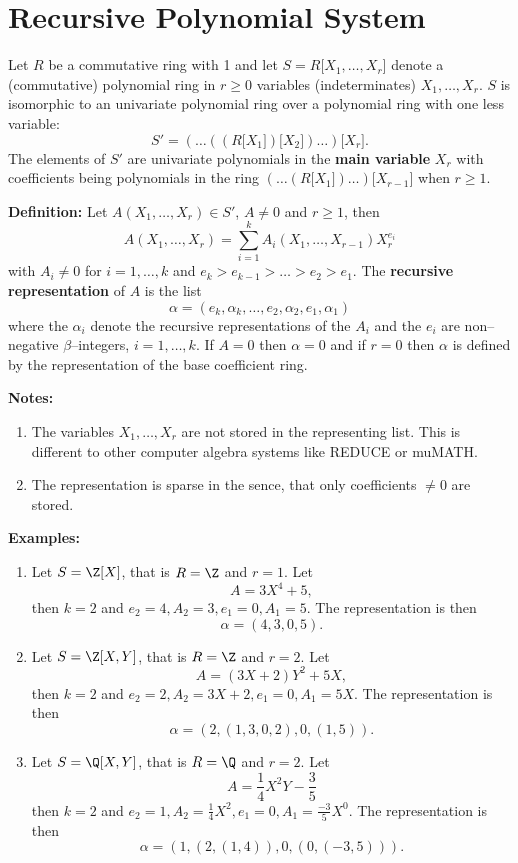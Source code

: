 \section{Recursive Polynomial System} %

Let $R$ be a commutative ring with 1 and let 
$S = R \lbrack X_1, \ldots, X_r \rbrack$ denote a  
(commutative) polynomial ring in $r \geq 0$ variables  
(indeterminates) $X_1, \ldots, X_r$.
$S$ is isomorphic to an univariate polynomial ring 
over a polynomial ring with one less variable:
$$ S' =
 ( \ldots ( (R \lbrack X_1 \rbrack) \lbrack X_2 \rbrack ) 
   \ldots ) \lbrack X_r \rbrack.
$$
The elements of $S'$ are univariate polynomials in the 
{\bf main variable} $X_r$ with coefficients being 
polynomials in the ring  
$( \ldots (R\lbrack X_1 \rbrack ) \ldots) \lbrack X_{r-1} \rbrack$
when $r \geq 1$. 

{\bf Definition:}
Let $A(X_1, \ldots, X_r) \in S'$, $A \neq 0$ and $r \geq 1$,
then 
$$ A(X_1, \ldots, X_r) = 
   \sum_{i=1}^{k} A_i(X_1, \ldots, X_{r-1}) X_r^{e_i}
$$ 
with $A_i \neq 0$ for $i=1,\ldots,k$ and 
$e_k > e_{k-1} > \ldots > e_2 > e_1$. 
The {\bf recursive representation} of $A$ is the list
$$
  \alpha = ( e_k, \alpha_k, \ldots, e_2, \alpha_2, e_1, \alpha_1 ) 
$$   
where the $\alpha_i$ denote the  
recursive representations of the $A_i$ and the $e_i$ are 
non--negative $\beta$--integers, $i=1,\ldots,k$.  
If $A = 0$ then $\alpha = 0$ and 
if $r = 0$ then $\alpha$ is defined by the 
representation of the base coefficient ring.  

{\bf Notes:}
\begin{enumerate}
\item The variables $X_1, \ldots, X_r$ are not stored 
      in the representing list. This is different to 
      other computer algebra systems like REDUCE or muMATH.
\item The representation is sparse in the sence, that 
      only coefficients $\neq 0$ are stored.
\end{enumerate}

{\bf Examples:}
\begin{enumerate}
\item Let $S = \Z \lbrack X \rbrack$, that is $R = \Z$ and $r = 1$.
      Let $$A = 3 X^4 + 5,$$
      then $k = 2$ and $e_2 = 4, A_2 = 3, e_1 = 0, A_1 = 5$. 
      The representation is then 
      $$ \alpha = ( 4, 3, 0, 5 ). $$
\item Let $S = \Z \lbrack X, Y \rbrack$, 
      that is $R = \Z$ and $r = 2$.
      Let $$A = ( 3 X + 2 ) Y^2 + 5 X,$$
      then $k = 2$ and $e_2 = 2, A_2 = 3 X + 2, e_1 = 0, A_1 = 5 X$. 
      The representation is then 
      $$ \alpha = ( 2, ( 1, 3, 0, 2 ), 0, ( 1, 5 ) ). $$
\item Let $S = \Q \lbrack X, Y \rbrack$, 
      that is $R = \Q$ and $r = 2$.
      Let $$A = \frac{1}{4} X^2 Y - \frac{3}{5}$$
      then $k = 2$ and $e_2 = 1, A_2 = \frac{1}{4} X^2, 
                        e_1 = 0, A_1 = \frac{-3}{5} X^0$. 
      The representation is then 
      $$ \alpha = ( 1, ( 2, ( 1, 4 ) ), 0, ( 0, ( -3, 5 ) ) ). $$
\end{enumerate}


